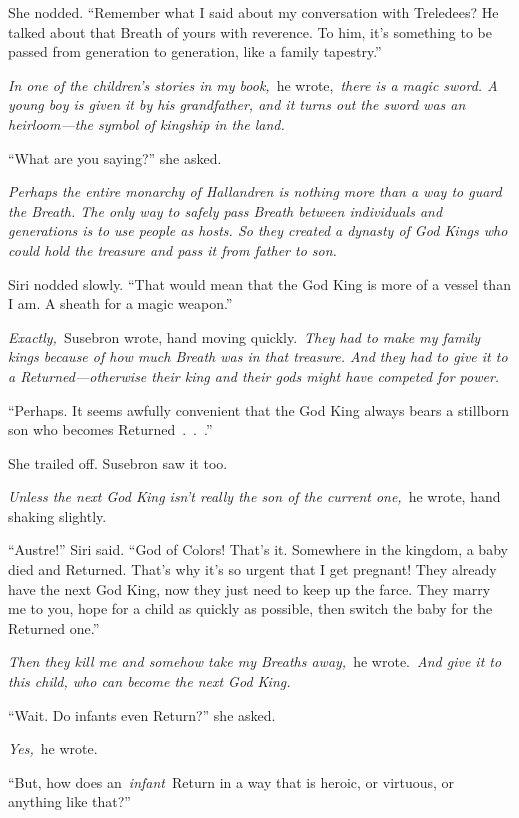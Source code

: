 She nodded. “Remember what I said about my conversation with Treledees? He talked about that Breath of yours with reverence. To him, it’s something to be passed from generation to generation, like a family tapestry.”

\textit{In one of the children’s stories in my book,}~he wrote,~\textit{there is a magic sword. A young boy is given it by his grandfather, and it turns out the sword was an heirloom—the symbol of kingship in the land.}

“What are you saying?” she asked.

\textit{Perhaps the entire monarchy of Hallandren is nothing more than a way to guard the Breath. The only way to safely pass Breath between individuals and generations is to use people as hosts. So they created a dynasty of God Kings who could hold the treasure and pass it from father to son.}

Siri nodded slowly. “That would mean that the God King is more of a vessel than I am. A sheath for a magic weapon.”

\textit{Exactly,}~Susebron wrote, hand moving quickly.~\textit{They had to make my family kings because of how much Breath was in that treasure. And they had to give it to a Returned—otherwise their king and their gods might have competed for power.}

“Perhaps. It seems awfully convenient that the God King always bears a stillborn son who becomes Returned~.~.~.”

She trailed off. Susebron saw it too.

\textit{Unless the next God King isn’t really the son of the current one,}~he wrote, hand shaking slightly.

“Austre!” Siri said. “God of Colors! That’s it. Somewhere in the kingdom, a baby died and Returned. That’s why it’s so urgent that I get pregnant! They already have the next God King, now they just need to keep up the farce. They marry me to you, hope for a child as quickly as possible, then switch the baby for the Returned one.”

\textit{Then they kill me and somehow take my Breaths away,}~he wrote.~\textit{And give it to this child, who can become the next God King.}

“Wait. Do infants even Return?” she asked.

\textit{Yes,}~he wrote.

“But, how does an~\textit{infant}~Return in a way that is heroic, or virtuous, or anything like that?”

